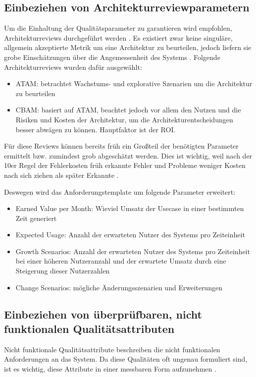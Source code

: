 \subsection{Einbeziehen von Architekturreviewparametern}
Um die Einhaltung der Qualitätsparameter zu garantieren wird empfohlen, Architekturreviews durchgeführt werden \cite[S. 20]{review}. Es existiert zwar \glqq keine singuläre, allgemein akzeptierte Metrik um eine Architektur zu beurteilen\grqq \cite[S. 19]{review}, jedoch liefern sie grobe Einschätzungen über die Angemessenheit des Systems \cite[S. 20]{review}. Folgende Architekturreviews wurden dafür ausgewählt:

\begin{itemize}
  \item ATAM: betrachtet Wachstums- und explorative Szenarien um die Architektur zu beurteilen \cite[S. 61]{review}
  \item CBAM: basiert auf ATAM, beachtet jedoch vor allem den Nutzen und die Risiken und Kosten der Architektur, um die Architekturentscheidungen besser abwägen zu können. Hauptfaktor ist der ROI. \cite[S. 67]{review}
\end{itemize}

Für diese Reviews können bereits früh ein Großteil der benötigten Parameter ermittelt bzw. zumindest grob abgeschätzt werden. Dies ist wichtig, weil nach der 10er Regel der Fehlerkosten früh erkannte Fehler und Probleme weniger Kosten nach sich ziehen als später Erkannte \cite[S. 154]{fehler}.

Deswegen wird das Anforderungstemplate um folgende Parameter erweitert:

\begin{itemize}
  \item Earned Value per Month: Wieviel Umsatz der Usecase in einer bestimmten Zeit generiert
  \item Expected Usage: Anzahl der erwarteten Nutzer des Systems pro Zeiteinheit
  \item Growth Scenarios: Anzahl der erwarteten Nutzer des Systems pro Zeiteinheit bei einer höheren Nutzeranzahl und der erwartete Umsatz durch eine Steigerung dieser Nutzerzahlen
  \item Change Scenarios: mögliche Änderungsszenarien und Erweiterungen
\end{itemize}

\subsection{Einbeziehen von überprüfbaren, nicht funktionalen Qualitätsattributen}
Nicht funktionale Qualitätsattribute beschreiben die nicht funktionalen Anforderungen an das System. Da diese Qualitäten oft ungenau formuliert sind, ist es wichtig, diese Attribute in einer messbaren Form aufzunehmen \cite[S. 9]{effektiv}.

